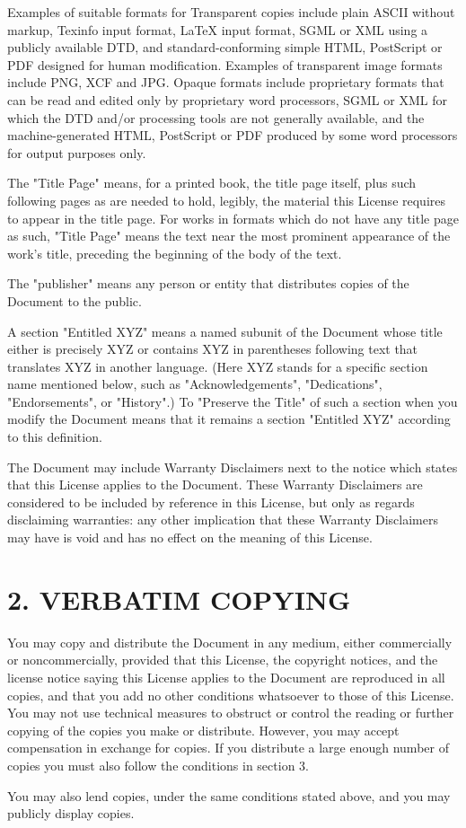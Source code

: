 Examples of suitable formats for Transparent copies include plain ASCII without markup, Texinfo input format, LaTeX input format, SGML or XML using a publicly available DTD, and standard-conforming simple HTML, PostScript or PDF designed for human modification. Examples of transparent image formats include PNG, XCF and JPG. Opaque formats include proprietary formats that can be read and edited only by proprietary word processors, SGML or XML for which the DTD and/or processing tools are not generally available, and the machine-generated HTML, PostScript or PDF produced by some word processors for output purposes only.\par
The "Title Page" means, for a printed book, the title page itself, plus such following pages as are needed to hold, legibly, the material this License requires to appear in the title page. For works in formats which do not have any title page as such, "Title Page" means the text near the most prominent appearance of the work's title, preceding the beginning of the body of the text.\par
The "publisher" means any person or entity that distributes copies of the Document to the public.\par
A section "Entitled XYZ" means a named subunit of the Document whose title either is precisely XYZ or contains XYZ in parentheses following text that translates XYZ in another language. (Here XYZ stands for a specific section name mentioned below, such as "Acknowledgements", "Dedications", "Endorsements", or "History".) To "Preserve the Title" of such a section when you modify the Document means that it remains a section "Entitled XYZ" according to this definition.\par
The Document may include Warranty Disclaimers next to the notice which states that this License applies to the Document. These Warranty Disclaimers are considered to be included by reference in this License, but only as regards disclaiming warranties: any other implication that these Warranty Disclaimers may have is void and has no effect on the meaning of this License.
\section{2. VERBATIM COPYING}
You may copy and distribute the Document in any medium, either commercially or noncommercially, provided that this License, the copyright notices, and the license notice saying this License applies to the Document are reproduced in all copies, and that you add no other conditions whatsoever to those of this License. You may not use technical measures to obstruct or control the reading or further copying of the copies you make or distribute. However, you may accept compensation in exchange for copies. If you distribute a large enough number of copies you must also follow the conditions in section 3.\par
You may also lend copies, under the same conditions stated above, and you may publicly display copies.
